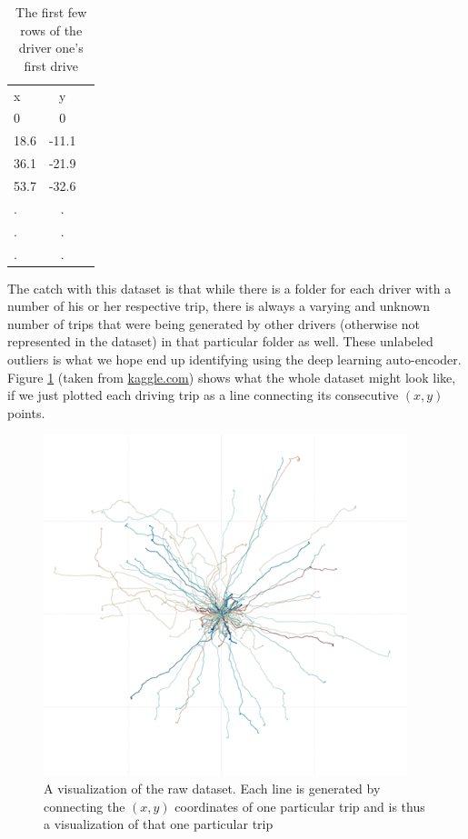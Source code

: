 \documentclass{vldb}
\begin{document}
\begin{table}
\centering
\begin{tabular}{l c r}
x & y\\
0 & 0\\
18.6 & -11.1 \\
36.1 & -21.9 \\
53.7 & -32.6 \\
. & .  \\
. & . \\
. & . \\	
\end{tabular}
\caption{The first few rows of the driver one's first drive}
\label{table:raw-trace}
\end{table}


The catch with this dataset is that while there is a folder for each driver with a number of his or her respective trip, there is always a varying and unknown number of trips that were being generated by other drivers (otherwise not represented in the dataset) in that particular folder as well. These unlabeled outliers is what we hope end up identifying using the deep learning auto-encoder. \\
Figure \ref{fig:axa-trip} (taken from \href{https://www.kaggle.com/c/axa-driver-telematics-analysis/data}{kaggle.com}) shows what the whole dataset might look like, if we just plotted each driving trip as a line connecting its consecutive $(x, y)$ points.
\begin{figure}
\centering
\includegraphics[width=\linewidth]{"pics/axa-trip"}
\caption{A visualization of the raw dataset. Each line is generated by connecting the $(x,y)$ coordinates of one particular trip and is thus a visualization of that one particular trip}
\label{fig:axa-trip}
\end{figure}
\end{document}
